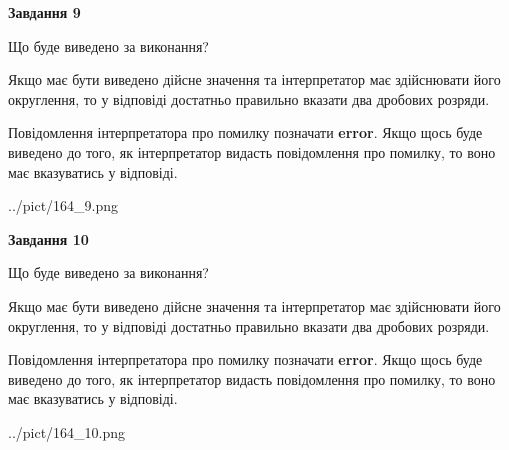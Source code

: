 \documentclass[12pt, ukrainian]{article}
\begin{document}
{\begin {Large}
{\begin {center}\textbf{Завдання 9}\end {center}}\par
Що буде виведено за виконання? \par

Якщо має бути виведено дійсне значення та інтерпретатор має здійснювати його округлення, 
то у відповіді достатньо правильно вказати два дробових розряди.

Повідомлення інтерпретатора про помилку позначати \textbf{error}.
Якщо щось буде виведено до того, як інтерпретатор видасть повідомлення про помилку, 
то воно має вказуватись у відповіді. \par

\begin{center}
	{../pict/164_9.png}
\end{center}
\newpage

{\begin {center}\textbf{Завдання 10}\end {center}}\par
Що буде виведено за виконання? \par

Якщо має бути виведено дійсне значення та інтерпретатор має здійснювати його округлення, 
то у відповіді достатньо правильно вказати два дробових розряди.

Повідомлення інтерпретатора про помилку позначати \textbf{error}.
Якщо щось буде виведено до того, як інтерпретатор видасть повідомлення про помилку, 
то воно має вказуватись у відповіді. \par

\begin{center}
	{../pict/164_10.png}
\end{center}
\newpage

\end {Large}}
\end{document}
